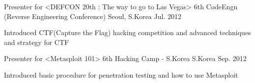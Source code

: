 

\begin{cventries}

\cventry
{Presenter for <DEFCON 20th : The way to go to Las Vegas>} %
{6th CodeEngn (Reverse Engineering Conference)} %
{Seoul, S.Korea} %
{Jul. 2012} %
{
    \begin{cvitems} %
    \item {Introduced CTF(Capture the Flag) hacking competition and advanced techniques and strategy for CTF}
    \end{cvitems}
}

\cventry
{Presenter for <Metasploit 101>} %
{6th Hacking Camp - S.Korea} %
{S.Korea} %
{Sep. 2012} %
{
    \begin{cvitems} %
    \item {Introduced basic procedure for penetration testing and how to use Metasploit}
    \end{cvitems}
}

\end{cventries}
